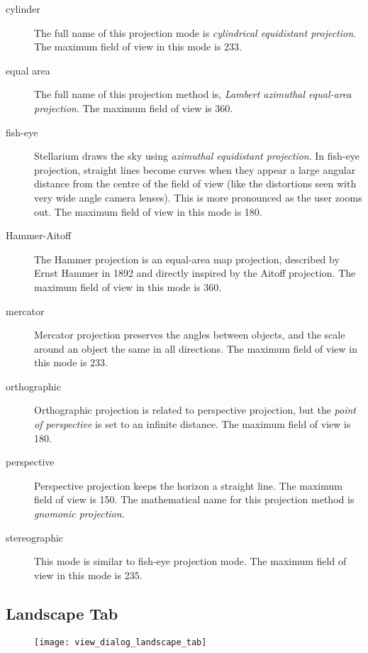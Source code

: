 \begin{description}
  \begin{description}
  \item[cylinder] The full name of this projection mode is
    \emph{cylindrical equidistant projection}. The maximum field of view
    in this mode is 233\degree.
  \item[equal area] The full name of this projection method is,
    \emph{Lambert azimuthal equal-area projection}. The maximum field of
    view is 360\degree.
  \item[fish-eye] Stellarium draws the sky using \emph{azimuthal
    equidistant projection}. In fish-eye projection, straight lines
    become curves when they appear a large angular distance from the
    centre of the field of view (like the distortions seen with very
    wide angle camera lenses). This is more pronounced as the user zooms
    out. The maximum field of view in this mode is 180\degree.
  \item[Hammer-Aitoff] The Hammer projection is an equal-area map
    projection, described by Ernst Hammer in 1892 and directly inspired
    by the Aitoff projection. The maximum field of view in this mode is
    360\degree.
  \item[mercator] Mercator projection preserves the angles between
    objects, and the scale around an object the same in all directions.
    The maximum field of view in this mode is 233\degree.
  \item[orthographic] Orthographic projection is related to
    perspective projection, but the \emph{point of perspective} is set
    to an infinite distance. The maximum field of view is 180\degree.
  \item[perspective] Perspective projection keeps the horizon a
    straight line. The maximum field of view is 150\degree. The mathematical
    name for this projection method is \emph{gnomonic projection}.
  \item[stereographic] This mode is similar to fish-eye projection
    mode. The maximum field of view in this mode is 235\degree.
  \end{description}
\end{description}

\subsection{Landscape Tab}\label{landscape-tab}

\begin{figure}[h]
\centering\texttt{[image: view\_dialog\_landscape\_tab]}
\end{figure}


